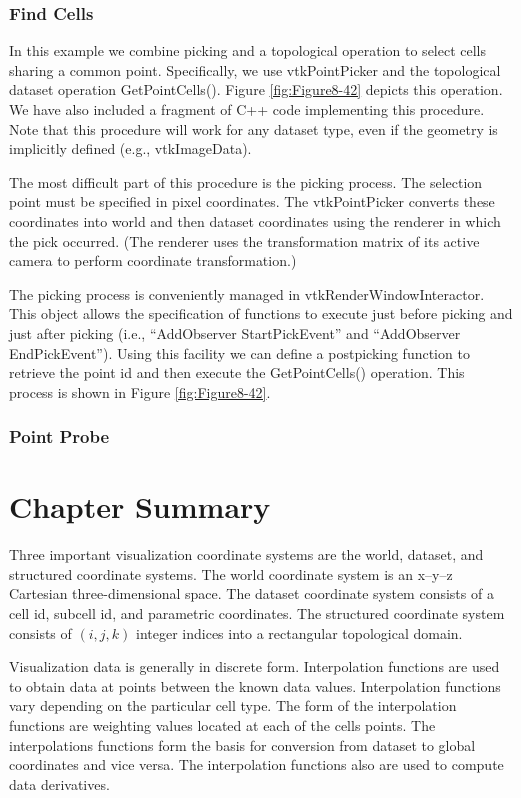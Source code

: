 \subsubsection{Find Cells}

In this example we combine picking and a topological operation to select cells sharing a common point. Specifically, we use vtkPointPicker and the topological dataset operation GetPointCells(). Figure \ref{fig:Figure8-42} depicts this operation. We have also included a fragment of C++ code implementing this procedure. Note that this procedure will work for any dataset type, even if the geometry is implicitly defined (e.g., vtkImageData).

The most difficult part of this procedure is the picking process. The selection point must be specified in pixel coordinates. The vtkPointPicker converts these coordinates into world and then dataset coordinates using the renderer in which the pick occurred. (The renderer uses the transformation matrix of its active camera to perform coordinate transformation.)

The picking process is conveniently managed in vtkRenderWindowInteractor. This object allows the specification of functions to execute just before picking and just after picking (i.e., ``AddObserver StartPickEvent'' and ``AddObserver EndPickEvent''). Using this facility we can define a postpicking function to retrieve the point id and then execute the GetPointCells() operation. This process is shown in Figure \ref{fig:Figure8-42}.

\subsubsection{Point Probe}
\label{subsec:examples.point_probe}

\section{Chapter Summary}

Three important visualization coordinate systems are the world, dataset, and structured coordinate systems. The world coordinate system is an x--y--z Cartesian three-dimensional space. The dataset coordinate system consists of a cell id, subcell id, and parametric coordinates. The structured coordinate system consists of $(i,j,k)$ integer indices into a rectangular topological domain.

Visualization data is generally in discrete form. Interpolation functions are used to obtain data at points between the known data values. Interpolation functions vary depending on the particular cell type. The form of the interpolation functions are weighting values located at each of the cells points. The interpolations functions form the basis for conversion from dataset to global coordinates and vice versa. The interpolation functions also are used to compute data derivatives.

